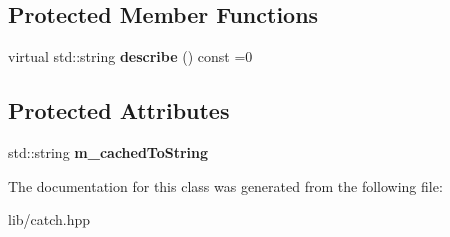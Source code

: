 \subsection*{Protected Member Functions}
\begin{DoxyCompactItemize}
\item 
\mbox{\label{class_catch_1_1_matchers_1_1_impl_1_1_matcher_untyped_base_a91d3a907dbfcbb596077df24f6e11fe2}} 
virtual std\+::string {\bfseries describe} () const =0
\end{DoxyCompactItemize}
\subsection*{Protected Attributes}
\begin{DoxyCompactItemize}
\item 
\mbox{\label{class_catch_1_1_matchers_1_1_impl_1_1_matcher_untyped_base_a951095c462657e7097a9a6dc4dde813f}} 
std\+::string {\bfseries m\+\_\+cached\+To\+String}
\end{DoxyCompactItemize}


The documentation for this class was generated from the following file\+:\begin{DoxyCompactItemize}
\item 
lib/catch.\+hpp\end{DoxyCompactItemize}
